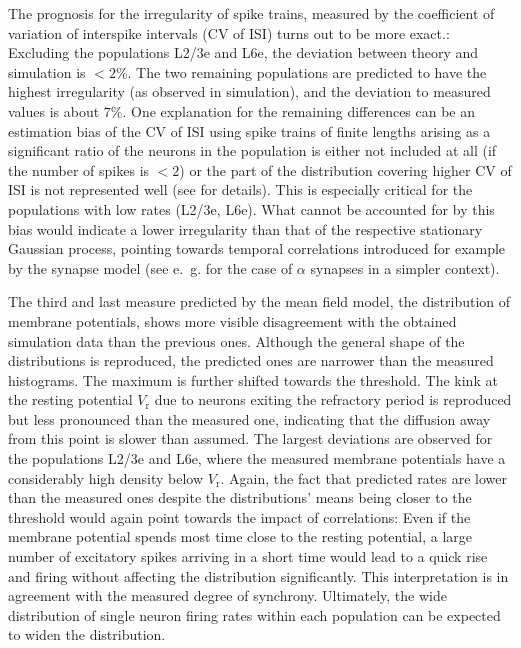 The prognosis for the irregularity of spike trains, measured by the coefficient of
variation of interspike intervals (CV of ISI) turns out to be more exact.:
Excluding the populations L2/3e and L6e, the deviation between theory and simulation 
is $<2 \%$. The two remaining 
populations are predicted to have the highest irregularity (as observed in simulation), 
and the deviation to measured values is about $7 \%$. 
One explanation for the remaining differences can be an estimation bias of the CV of ISI 
using spike trains of finite lengths arising as a significant ratio of the neurons in the 
population is either not included at all (if the number of spikes is $ < 2$) or the part of the distribution 
covering higher CV of ISI is not represented well (see \cite{nawrot2010analysis} for details). 
This is especially critical for the populations with low rates (L2/3e, L6e).
What cannot be accounted for by this bias would indicate a lower irregularity than that 
of the respective stationary Gaussian process, pointing towards temporal correlations
introduced for example by the synapse model 
(see e.~g. \cite{brunel1999fast} for the case of $\alpha$ synapses in a simpler context). 

The third and last measure predicted by the mean field model, the distribution of 
membrane potentials, shows more visible disagreement with the obtained simulation 
data than the previous ones. Although the general shape of the distributions is reproduced, the predicted
ones are narrower than the measured histograms. The maximum is further shifted 
towards the threshold. 
The kink at the resting potential $V_\text{r}$ due to neurons exiting the 
refractory period is reproduced but less pronounced than the measured one, indicating that the diffusion
away from this point is slower than assumed. The largest deviations are observed for 
the populations L2/3e and L6e, where the measured membrane potentials have a considerably 
high density below $V_\text{r}$.
Again, the fact that predicted rates are lower than the measured ones 
despite the distributions' means being closer to the threshold
would again point towards the impact of correlations:
Even if the membrane potential spends most time close to the resting potential, 
a large number of excitatory spikes arriving in a short time would lead to a quick rise and
firing without affecting the distribution significantly.  
This interpretation is in agreement with the measured degree of synchrony. 
Ultimately, the wide distribution of single neuron firing rates within each population
can be expected to widen the distribution. 

